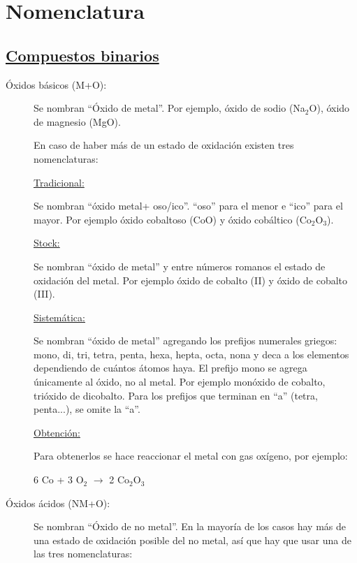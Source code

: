 \section{Nomenclatura}

\subsection*{\underline{Compuestos binarios}}

\begin{description}

\item[Óxidos básicos (M+O):]\hfil

Se nombran ``Óxido de metal''. Por ejemplo, óxido de sodio (Na$_2$O), óxido de magnesio (MgO).

En caso de haber más de un estado de oxidación existen tres nomenclaturas:

\underline{Tradicional:}

Se nombran ``óxido metal+ oso/ico''. ``oso'' para el menor e ``ico'' para el mayor. Por ejemplo óxido cobaltoso (CoO) y óxido cobáltico (Co$_2$O$_3$).

\underline{Stock:}

Se nombran ``óxido de metal'' y entre números romanos el estado de oxidación del metal. Por ejemplo óxido de cobalto (II) y óxido de cobalto (III).

\underline{Sistemática:}

Se nombran ``óxido de metal'' agregando los prefijos numerales griegos: mono, di, tri, tetra, penta, hexa, hepta, octa, nona y deca a los elementos dependiendo de cuántos átomos haya. El prefijo mono se agrega únicamente al óxido, no al metal. Por ejemplo monóxido de cobalto, trióxido de dicobalto. Para los prefijos que terminan en ``a'' (tetra, penta...), se omite la ``a''.

\skipline
\underline{Obtención:}

Para obtenerlos se hace reaccionar el metal con gas oxígeno, por ejemplo:

\hfil6 Co + 3 O$_2$ $\rightarrow$ 2 Co$_2$O$_3$\hfil





\item[Óxidos ácidos (NM+O):]\hfil

Se nombran ``Óxido de no metal''. En la mayoría de los casos hay más de una estado de oxidación posible del no metal, así que hay que usar una de las tres nomenclaturas:


\end{description}
